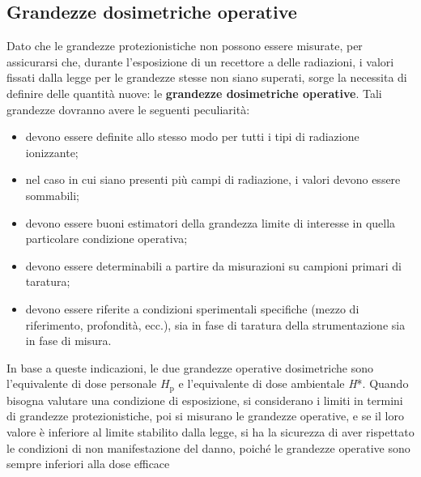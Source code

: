\documentclass{report}
\numberwithin{equation}{section}
\numberwithin{figure}{section}
\begin{document}
\subsection{Grandezze dosimetriche operative}
Dato che le grandezze protezionistiche non possono essere misurate, per assicurarsi che, durante l'esposizione di un recettore a delle radiazioni, i valori fissati dalla legge per le grandezze stesse non siano superati, sorge la necessita di definire delle quantità nuove: le \textbf{grandezze dosimetriche operative}. Tali grandezze dovranno avere le seguenti peculiarità:
\begin{itemize}[label=$-$]
    \item devono essere definite allo stesso modo per tutti i tipi di radiazione ionizzante;
    \item nel caso in cui siano presenti più campi di radiazione, i valori devono essere sommabili;
    \item devono essere buoni estimatori della grandezza limite di interesse in quella particolare condizione operativa;
    \item devono essere determinabili a partire da misurazioni su campioni primari di taratura;
    \item devono essere riferite a condizioni sperimentali specifiche (mezzo di riferimento, profondità, ecc.), sia in fase di taratura della strumentazione sia in fase di misura.
\end{itemize}
In base a queste indicazioni, le due grandezze operative dosimetriche sono l'equivalente di dose personale $H_\mathrm{p}$ e l'equivalente di dose ambientale \textit{H}*. Quando bisogna valutare una condizione di esposizione, si considerano i limiti in termini di grandezze protezionistiche, poi si misurano le grandezze operative, e se il loro valore è inferiore al limite stabilito dalla legge, si ha la sicurezza di aver rispettato le condizioni di non manifestazione del danno, poiché le grandezze operative sono sempre inferiori alla dose efficace
\end{document}
